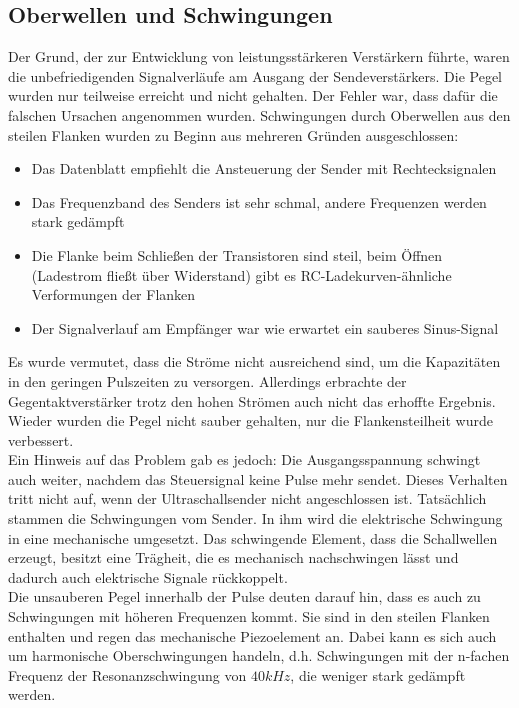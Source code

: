 \subsection{Oberwellen und Schwingungen} %
Der Grund, der zur Entwicklung von leistungsstärkeren Verstärkern führte, waren die unbefriedigenden Signalverläufe am Ausgang der Sendeverstärkers. Die Pegel wurden nur teilweise erreicht und nicht gehalten. Der Fehler war, dass dafür die falschen Ursachen angenommen wurden. Schwingungen durch Oberwellen aus den steilen Flanken wurden zu Beginn aus mehreren Gründen ausgeschlossen:
\begin{itemize}
	\item Das Datenblatt empfiehlt die Ansteuerung der Sender mit Rechtecksignalen
	\item Das Frequenzband des Senders ist sehr schmal, andere Frequenzen werden stark gedämpft
	\item Die Flanke beim Schließen der Transistoren sind steil, beim Öffnen (Ladestrom fließt über Widerstand) gibt es RC-Ladekurven-ähnliche Verformungen der Flanken
	\item Der Signalverlauf am Empfänger war wie erwartet ein sauberes Sinus-Signal
\end{itemize}
Es wurde vermutet, dass die Ströme nicht ausreichend sind, um die Kapazitäten in den geringen Pulszeiten zu versorgen. Allerdings erbrachte der Gegentaktverstärker trotz den hohen Strömen auch nicht das erhoffte Ergebnis. Wieder wurden die Pegel nicht sauber gehalten, nur die Flankensteilheit wurde verbessert.\\
Ein Hinweis auf das Problem gab es jedoch: Die Ausgangsspannung schwingt auch weiter, nachdem das Steuersignal keine Pulse mehr sendet. Dieses Verhalten tritt nicht auf, wenn der Ultraschallsender nicht angeschlossen ist. Tatsächlich stammen die Schwingungen vom Sender. In ihm wird die elektrische Schwingung in eine mechanische umgesetzt. Das schwingende Element, dass die Schallwellen erzeugt, besitzt eine Trägheit, die es mechanisch nachschwingen lässt und dadurch auch elektrische Signale rückkoppelt.\\
Die unsauberen Pegel innerhalb der Pulse deuten darauf hin, dass es auch zu Schwingungen mit höheren Frequenzen kommt. Sie sind in den steilen Flanken enthalten und regen das mechanische Piezoelement an. Dabei kann es sich auch um harmonische Oberschwingungen handeln, d.h. Schwingungen mit der n-fachen Frequenz der Resonanzschwingung von $40 kHz$, die weniger stark gedämpft werden.
